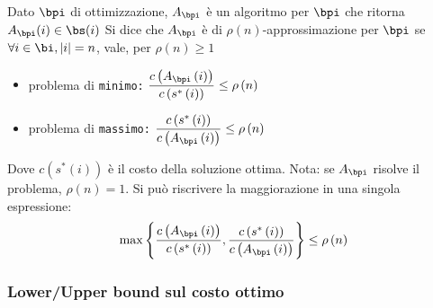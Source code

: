 \begin{definition}
    \label{def:algoapprossimazione}
    Dato $\bpi$ di ottimizzazione,
    $A_{\bpi}$
    è un algoritmo per
    $\bpi$
    che ritorna $
    A_{\bpi} (i) \in \bs (i)
    $
    Si dice che $A_{\bpi}$ è di
    $\rho (n)$-approssimazione
    per $\bpi$ se $\forall i \in \bi, |i|=n$, vale, per $\rho(n) \geq 1$
    \begin{itemize}
        \item problema di \texttt{minimo:} $
            \displaystyle
            \frac{
                c \left( 
                    A_{\bpi} \left( i \right)
                \right)
            }{
                c \left( 
                    s^* \left( i \right)
                \right)
            } \leq \rho \left( n \right)
            $
        \item problema di \texttt{massimo:} $
            \displaystyle
            \frac{
                c \left( 
                    s^* \left( i \right)
                \right)
            }{
                c \left( 
                    A_{\bpi} \left( i \right)
                \right)
            } \leq \rho \left( n \right)
            $
    \end{itemize}
    Dove $
        c \left( 
            s^* \left( i \right)
        \right)
    $ è il costo della soluzione ottima.
    Nota: se $A_{\bpi}$ risolve il problema, $\rho(n)=1$.
    Si può riscrivere la maggiorazione in una singola espressione:
    \begin{equation*}
        \max 
        \left\{ 
            \frac{
                c \left( 
                    A_{\bpi} \left( i \right)
                \right)
            }{
                c \left( 
                    s^* \left( i \right)
                \right)
            }
            ,
            \frac{
                c \left( 
                    s^* \left( i \right)
                \right)
            }{
                c \left( 
                    A_{\bpi} \left( i \right)
                \right)
            }
        \right\}
        \leq \rho \left( n \right)
    \end{equation*}
\end{definition}

\subsubsection{Lower/Upper bound sul costo ottimo}

